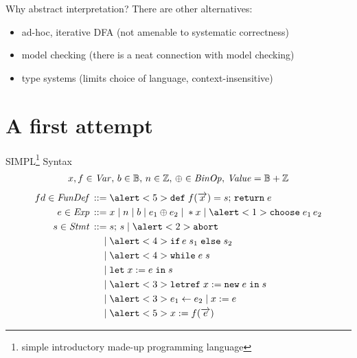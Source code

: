 \documentclass[aspectratio=169]{beamer}
\begin{document}


\begin{frame}{Why abstract interpretation?}
There are other alternatives:
\begin{itemize}[<+->]
\item ad-hoc, iterative DFA (not amenable to systematic correctness)
\item model checking (there is a neat connection with model checking)
\item type systems (limits choice of language, context-insensitive)
\end{itemize}
\end{frame}

\section{A first attempt}
\begin{frame}{SIMPL\footnote{simple introductory made-up programming language} Syntax}
  \vspace{-2em}
  \small
  \begin{gather*}
    x,f \in \mathit{Var},\, b \in \mathbb{B},\, n \in \mathbb{Z},\, \oplus \in \mathit{BinOp},\,\mathit{Value} = \mathbb{B} + \mathbb{Z}
  \end{gather*}\vspace{-2em}
  \begin{align*}
    fd \in \ns{FunDef} \eDEF & \alert<5>{\kw{def}\; f(\vo{x}) = s;\,\kw{return}\; e} \\
    e \in \Exp \eDEF & x \eOR n \eOR b \eOR e_1 \oplus e_2 \eOR *x \eOR \alert<1>{\kw{choose}\;e_1\,e_2} \\
    s \in \Stmt \eDEF & s;\,s \eOR \alert<2>{\kw{abort}} \\
    \eOR & \alert<4>{\kw{if}\, e\; s_1 \; \kw{else} \; s_2} \\
    \eOR & \alert<4>{\kw{while}\; e\; s} \\
    \eOR & \kw{let}\; x := e \;\kw{in}\;s \\
    \eOR & \alert<3>{\kw{letref}\; x := \kw{new}\;e \;\kw{in}\;s} \\
    \eOR & \alert<3>{e_1 \update e_2} \eOR x := e \\
    \eOR & \alert<5>{x := f(\vo{e})}
  \end{align*}
\end{frame}
\end{document}
